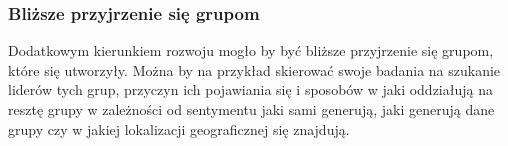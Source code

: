 \subsubsection{Bliższe przyjrzenie się grupom}
Dodatkowym kierunkiem rozwoju mogło by być bliższe przyjrzenie się grupom,
które się utworzyły. Można by na przykład skierować swoje badania
na szukanie liderów tych grup, przyczyn ich pojawiania się i sposobów w jaki
oddziałują na resztę grupy w zależności od sentymentu jaki sami generują,
jaki generują dane grupy czy w jakiej lokalizacji geograficznej się znajdują. 




